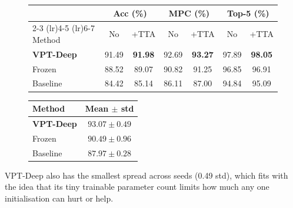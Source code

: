 \begin{figure}[H]
\centering
\begin{minipage}{0.62\textwidth}
\centering
\small
\begin{tabular}{lcccccc}
\toprule
& \multicolumn{2}{c}{Acc (\%)} & \multicolumn{2}{c}{MPC (\%)} & \multicolumn{2}{c}{Top-5 (\%)} \\
\cmidrule(lr){2-3} \cmidrule(lr){4-5} \cmidrule(lr){6-7}
Method & No & +TTA & No & +TTA & No & +TTA \\
\midrule
\textbf{VPT-Deep}   & 91.49 & \textbf{91.98} & 92.69 & \textbf{93.27} & 97.89 & \textbf{98.05} \\
Frozen              & 88.52 & 89.07 & 90.82 & 91.25 & 96.85 & 96.91 \\
Baseline            & 84.42 & 85.14 & 86.11 & 87.00 & 94.84 & 95.09 \\
\bottomrule
\end{tabular}
\label{tab:tta}
\end{minipage}\hfill
\begin{minipage}{0.36\textwidth}
\centering
\small
\begin{tabular}{lc}
\toprule
Method & Mean $\pm$ std \\
\midrule
\textbf{VPT-Deep} & $93.07 \pm 0.49$ \\
Frozen            & $90.49 \pm 0.96$ \\
Baseline          & $87.97 \pm 0.28$ \\
\bottomrule
\end{tabular}
\label{tab:seeds}
\end{minipage}
\end{figure}

\noindent VPT-Deep also has the smallest spread across seeds (0.49 std), which fits with the idea that its tiny trainable parameter count limits how much any one initialisation can hurt or help.
